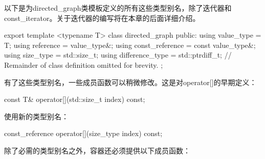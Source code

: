 以下是为directed\_graph类模板定义的所有这些类型别名，除了迭代器和const\_iterator。关于迭代器的编写将在本章的后面详细介绍。

\begin{cpp}
export template <typename T>
class directed_graph
{
    public:
        using value_type = T;
        using reference = value_type&;
        using const_reference = const value_type&;
        using size_type = std::size_t;
        using difference_type = std::ptrdiff_t;
        // Remainder of class definition omitted for brevity.
};
\end{cpp}

有了这些类型别名，一些成员函数可以稍微修改。这是对operator[]的早期定义：

\begin{cpp}
const T& operator[](std::size_t index) const;
\end{cpp}

使用新的类型别名：

\begin{cpp}
const_reference operator[](size_type index) const;
\end{cpp}


除了必需的类型别名之外，容器还必须提供以下成员函数：

